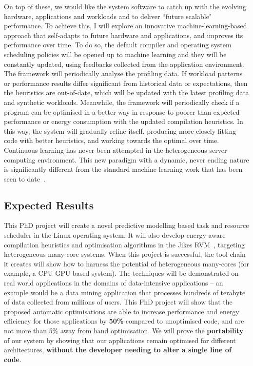 On top of these, we would like the system software to catch up with the evolving hardware,
applications and workloads and to deliver ``future scalable" performance. To achieve this, I will explore an innovative
machine-learning-based approach that self-adapts to future hardware and applications, and improves its performance over time.
To do so, the default compiler and operating system scheduling policies will be opened up to machine learning and they will be constantly
updated, using feedbacks collected from the application environment. The framework will periodically analyse the profiling data. If workload
patterns or performance results differ significant from historical data or expectations, then the heuristics are out-of-date, which will be updated
with the latest profiling data and synthetic workloads. Meanwhile, the framework will periodically check if a program can be optimised in a
better way in response to poorer than expected performance or energy consumption with the updated compilation heuristics.
In this way, the system will gradually refine itself, producing more closely fitting code with better heuristics, and working towards the optimal over time.
Continuous learning has never been attempted in the heterogeneous server computing environment. This new paradigm
with a dynamic, never ending nature is significantly different from the standard machine learning work that has been seen to date~\cite{onlineoptimal}.
\subsection{Expected Results}
\begin{shaded}
This PhD project will create a novel predictive modelling based task and resource scheduler in the Linux operating system. It will also develop energy-aware compilation heuristics and optimisation algorithms in the Jikes RVM~\cite{JRVM}, targeting heterogeneous many-core systems.
When this project is successful, the tool-chain it creates will show how to harness the potential of heterogeneous many-cores (for example, a CPU-GPU based system). The techniques will be demonstrated on real world applications in the domains of data-intensive applications -- an example would be a data mining application that processes hundreds of terabyte of data collected from millions of users. This PhD project will show that the proposed automatic optimisations are able to increase performance and energy efficiency for those applications by \textbf{50\%} compared to unoptimised code, and are not more than 5\% away from hand optimisation. We will prove the \textbf{portability} of our system by showing that our applications remain optimised for different architectures, \textbf{without the developer needing to alter a single line of code}.
\end{shaded}

